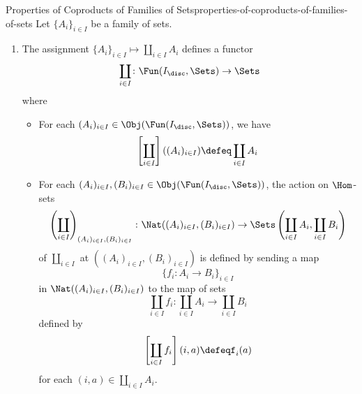 \begin{proposition}{Properties of Coproducts of Families of Sets}{properties-of-coproducts-of-families-of-sets}%
    Let $\{A_{i}\}_{i\in I}$ be a family of sets.%
    \begin{enumerate}
        \item\label{properties-of-coproducts-of-families-of-sets-functoriality}The assignment $\{A_{i}\}_{i\in I}\mapsto\coprod_{i\in I}A_{i}$ defines a functor
            \[
                \coprod_{i\in I}%
                \colon%
                \Fun(I_{\disc},\Sets)%
                \to%
                \Sets%
            \]%
            where
            \begin{itemize}
                \item{}For each $(A_{i})_{i\in I}\in\Obj(\Fun(I_{\disc},\Sets))$, we have
                    \[
                        \left[\coprod_{i\in I}\right]((A_{i})_{i\in I})%
                        \defeq%
                        \coprod_{i\in I}A_{i}%
                    \]%
                \item{}For each $(A_{i})_{i\in I},(B_{i})_{i\in I}\in\Obj(\Fun(I_{\disc},\Sets))$, the action on $\Hom$-sets
                    \[
                        \left(\coprod_{i\in I}\right)_{(A_{i})_{i\in I},(B_{i})_{i\in I}}
                        \colon
                        \Nat((A_{i})_{i\in I},(B_{i})_{i\in I})%
                        \to%
                        \Sets\left(\coprod_{i\in I}A_{i},\coprod_{i\in I}B_{i}\right)%
                    \]%
                    of $\coprod_{i\in I}$ at $((A_{i})_{i\in I},(B_{i})_{i\in I})$ is defined by sending a map
                    \[
                        \{%
                            f_{i}%
                            \colon%
                            A_{i}%
                            \to%
                            B_{i}
                        \}_{i\in I}%
                    \]%
                    in $\Nat((A_{i})_{i\in I},(B_{i})_{i\in I})$ to the map of sets
                    \[
                        \coprod_{i\in I}f_{i}%
                        \colon
                        \coprod_{i\in I}A_{i}%
                        \to%
                        \coprod_{i\in I}B_{i}%
                    \]%
                    defined by
                    \[
                        \left[\coprod_{i\in I}f_{i}\right](i,a)
                        \defeq%
                        f_{i}(a)
                    \]%
                    for each $(i,a)\in\coprod_{i\in I}A_{i}$.
            \end{itemize}
    \end{enumerate}
\end{proposition}
